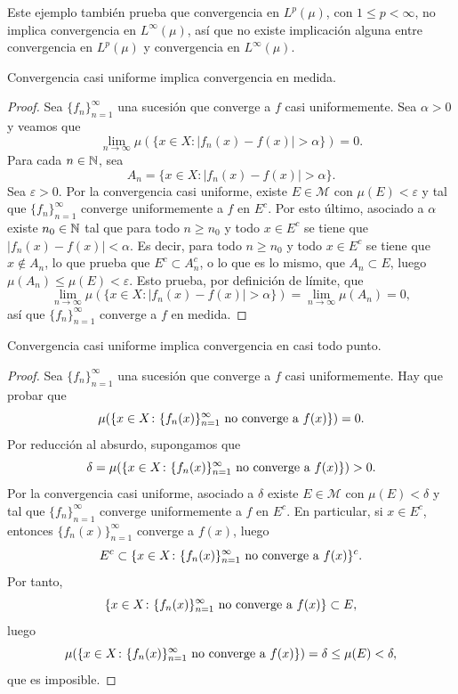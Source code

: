 \documentclass[a4paper, 11pt, oneside]{report}
\begin{document}
Este ejemplo también prueba que convergencia en $L^p(\mu)$, con $1 \leq p < \infty$, no implica convergencia en $L^\infty(\mu)$, así que no existe implicación alguna entre convergencia en $L^p(\mu)$ y convergencia en $L^\infty(\mu)$.

\begin{theorem}
  Convergencia casi uniforme implica convergencia en medida.
\end{theorem}

\begin{proof}
  Sea $\{f_n\}_{n=1}^\infty$ una sucesión que converge a $f$ casi uniformemente. Sea $\alpha > 0$ y veamos que
  \[\lim_{n \to \infty} \mu\left(\{x \in X \colon |f_n(x)-f(x)|>\alpha\}\right) = 0.\]
  Para cada $n \in \mathbb N$, sea
  \[A_n = \{x \in X \colon |f_n(x)-f(x)| > \alpha\}.\]
  Sea $\varepsilon>0$. Por la convergencia casi uniforme, existe $E \in \mathcal{M}$ con $\mu(E)<\varepsilon$ y tal que $\{f_n\}_{n=1}^\infty$ converge uniformemente a $f$ en $E^c$. Por esto último, asociado a $\alpha$ existe $n_0\in\mathbb N$ tal que para todo $n \geq n_0$ y todo $x \in E^c$ se tiene que
  $|f_n(x)-f(x)| < \alpha$. Es decir, para todo $n \geq n_0$ y todo $x \in E^c$ se tiene que $x \not\in A_n$, lo que prueba que $E^c \subset A_n^c$, o lo que es lo mismo, que $A_n \subset E$, luego $\mu(A_n)\leq \mu(E)<\varepsilon$. Esto prueba, por definición de límite, que
  \[\lim_{n \to \infty} \mu\left(\{x \in X \colon |f_n(x)-f(x)|>\alpha\}\right) = \lim_{n \to \infty} \mu(A_n) =0,\]
  así que $\{f_n\}_{n=1}^\infty$ converge a $f$ en medida.
\end{proof}

\begin{theorem}
  Convergencia casi uniforme implica convergencia en casi todo punto.
\end{theorem}

\begin{proof}
  Sea $\{f_n\}_{n=1}^\infty$ una sucesión que converge a $f$ casi uniformemente. Hay que probar que
  \[\mu(\{x \in X \colon \{f_n(x)\}_{n=1}^\infty \textup{ no converge a } f(x)\}) = 0.\]
  Por reducción al absurdo, supongamos que
  \[\delta = \mu(\{x \in X \colon \{f_n(x)\}_{n=1}^\infty \textup{ no converge a } f(x)\}) > 0.\]
  Por la convergencia casi uniforme, asociado a $\delta$ existe $E \in \mathcal{M}$ con $\mu(E)<\delta$ y tal que $\{f_n\}_{n=1}^\infty$ converge uniformemente a $f$ en $E^c$. En particular, si $x \in E^c$, entonces $\{f_n(x)\}_{n=1}^\infty$ converge a $f(x)$, luego 
  \[E^c \subset \{x \in X \colon \{f_n(x)\}_{n=1}^\infty \textup{ no converge a } f(x)\}^c.\]
  Por tanto,
  \[\{x \in X \colon \{f_n(x)\}_{n=1}^\infty \textup{ no converge a } f(x)\} \subset E,\]
  luego
  \[\mu(\{x \in X \colon \{f_n(x)\}_{n=1}^\infty \textup{ no converge a } f(x)\}) = \delta \leq \mu(E) < \delta,\]
  que es imposible.
\end{proof}
\end{document}
